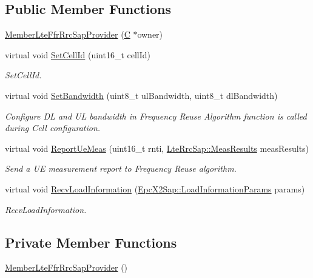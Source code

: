 \subsection*{Public Member Functions}
\begin{DoxyCompactItemize}
\item 
\hyperlink{classns3_1_1MemberLteFfrRrcSapProvider_a4ad387cb8283b85277efacdbd843a550}{Member\+Lte\+Ffr\+Rrc\+Sap\+Provider} (\hyperlink{loss__COST231__small__cities__urban_8m_aaa53ca0b650dfd85c4f59fa156f7a2cc}{C} $\ast$owner)
\item 
virtual void \hyperlink{classns3_1_1MemberLteFfrRrcSapProvider_a2b4173acbb68dd1b07bd7bfdb6c88280}{Set\+Cell\+Id} (uint16\+\_\+t cell\+Id)
\begin{DoxyCompactList}\small\item\em Set\+Cell\+Id. \end{DoxyCompactList}\item 
virtual void \hyperlink{classns3_1_1MemberLteFfrRrcSapProvider_ae064f568fc3512b1ae13aa3ce4ad60ab}{Set\+Bandwidth} (uint8\+\_\+t ul\+Bandwidth, uint8\+\_\+t dl\+Bandwidth)
\begin{DoxyCompactList}\small\item\em Configure DL and UL bandwidth in Frequency Reuse Algorithm function is called during Cell configuration. \end{DoxyCompactList}\item 
virtual void \hyperlink{classns3_1_1MemberLteFfrRrcSapProvider_a44cd48b3be31565715b472415f63ec8c}{Report\+Ue\+Meas} (uint16\+\_\+t rnti, \hyperlink{structns3_1_1LteRrcSap_1_1MeasResults}{Lte\+Rrc\+Sap\+::\+Meas\+Results} meas\+Results)
\begin{DoxyCompactList}\small\item\em Send a UE measurement report to Frequency Reuse algorithm. \end{DoxyCompactList}\item 
virtual void \hyperlink{classns3_1_1MemberLteFfrRrcSapProvider_ac9367823ef9e24bd0d78d5d70a7cd61d}{Recv\+Load\+Information} (\hyperlink{structns3_1_1EpcX2Sap_1_1LoadInformationParams}{Epc\+X2\+Sap\+::\+Load\+Information\+Params} params)
\begin{DoxyCompactList}\small\item\em Recv\+Load\+Information. \end{DoxyCompactList}\end{DoxyCompactItemize}
\subsection*{Private Member Functions}
\begin{DoxyCompactItemize}
\item 
\hyperlink{classns3_1_1MemberLteFfrRrcSapProvider_ac4513d1a4545ebc7e10c99370504f998}{Member\+Lte\+Ffr\+Rrc\+Sap\+Provider} ()
\end{DoxyCompactItemize}
